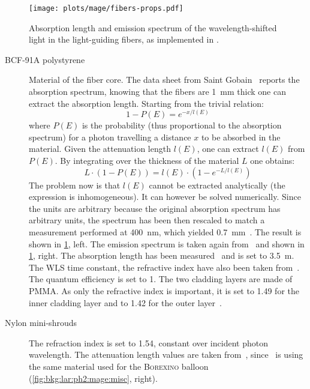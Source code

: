 \begin{figure}
  \centering
  \texttt{[image: plots/mage/fibers-props.pdf]}
  \caption{%
    Absorption length and emission spectrum of the wavelength-shifted light in the
    light-guiding fibers, as implemented in \mage.
  }\label{fig:bkg:lar:ph2:mage:fibers-props}
\end{figure}

\begin{description}

  \item[BCF-91A polystyrene] Material of the fiber core. The data sheet from Saint
    Gobain~\cite{FibersData} reports the absorption spectrum, knowing that the fibers are
    1~mm thick one can extract the absorption length. Starting from the trivial relation:
    \[
      1 - P(E) = e^{-x/l(E)}
    \]
    where $P(E)$ is the probability (thus proportional to the absorption
    spectrum) for a photon travelling a distance $x$ to be absorbed in the
    material. Given the attenuation length $l(E)$, one can extract $l(E)$ from
    $P(E)$. By integrating over the thickness of the material $L$ one obtains:
    \[
      L \cdot (1 - P(E)) = l(E) \cdot (1 - e^{-L/l(E)})
    \]
    The problem now is that $l(E)$ cannot be extracted analytically (the expression is
    inhomogeneous). It can however be solved numerically.  Since the units are arbitrary
    because the original absorption spectrum has arbitrary units, the spectrum has been
    then rescaled to match a measurement performed at 400~nm, which yielded
    0.7~mm~\cite{Kneissl2012}. The result is shown in
    \cref{fig:bkg:lar:ph2:mage:fibers-props}, left. The emission spectrum is taken again
    from~\cite{FibersData} and shown in \cref{fig:bkg:lar:ph2:mage:fibers-props}, right.
    The absorption length has been measured~\cite{Kneissl2012} and is set to 3.5~m. The
    WLS time constant, the refractive index have also been taken from~\cite{FibersData}.
    The quantum efficiency is set to 1. The two cladding layers are made of PMMA. As only
    the refractive index is important, it is set to 1.49 for the inner cladding layer and
    to 1.42 for the outer layer~\cite{FibersData}.

  \item[Nylon mini-shrouds] The refraction index is set to 1.54, constant over
    incident photon wavelength. The attenuation length values are taken
    from~\cite{Agostini2017b}, since \gerda\ is using the same material used for the
    \textsc{Borexino} balloon (\cref{fig:bkg:lar:ph2:mage:misc}, right).

\end{description}

\chapendgliph{}

